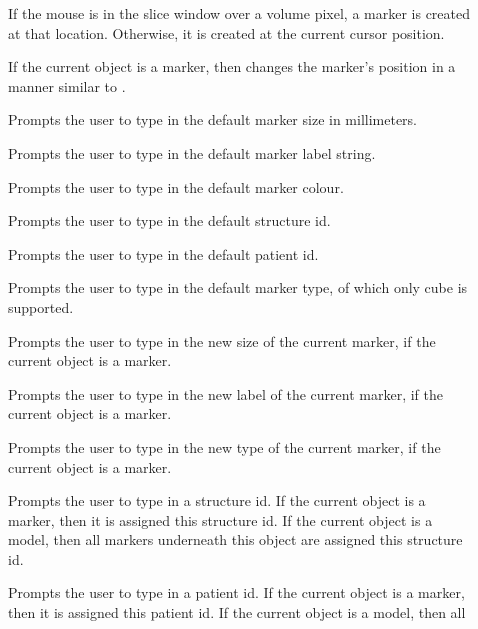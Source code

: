 \begin{description}
\item[]  If the mouse is in the slice window
        over a volume pixel, a marker is created at that location.  Otherwise,
        it is created at the current cursor position.
\item[]  If the current object is a marker,
        then changes the marker's position in a manner similar to
        .
\item[]  Prompts the user to type in the default
        marker size in millimeters.
\item[]  Prompts the user to type in the default
        marker label string.
\item[]  Prompts the user to type in the
        default marker colour.
\item[]  Prompts the user to type in the
        default structure id.
\item[]  Prompts the user to type in the
        default patient id.
\item[]  Prompts the user to type in the
        default marker type, of which only cube is supported.
\item[]  Prompts the user to type in the
        new size of the current marker, if the current object is a marker.
\item[]  Prompts the user to type in the
        new label of the current marker, if the current object is a marker.
\item[]  Prompts the user to type in the
        new type of the current marker, if the current object is a marker.
\item[]  Prompts the user to type in a
        structure id.  If the current object is a marker, then it is assigned
        this structure id.  If the current object is a model, then all
        markers underneath this object are assigned this structure id.
\item[]  Prompts the user to type in a
        patient id.  If the current object is a marker, then it is assigned
        this patient id.  If the current object is a model, then all

\end{description}
